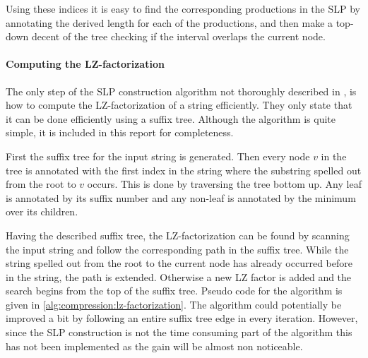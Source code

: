 \documentclass[twoside,11pt,openright]{report}
\begin{document}
Using these indices it is easy to find the corresponding productions in the SLP by annotating the derived length for each of the productions, and then make a top-down decent of the tree checking if the interval overlaps the current node.

\paragraph{Computing the LZ-factorization}
The only step of the SLP construction algorithm not thoroughly described in \cite{Rytter2003211}, is how to compute the LZ-factorization of a string efficiently. They only state that it can be done efficiently using a suffix tree. Although the algorithm is quite simple, it is included in this report for completeness.

First the suffix tree for the input string is generated. Then every node $v$ in the tree is annotated with the first index in the string where the substring spelled out from the root to $v$ occurs. This is done by traversing the tree bottom up. Any leaf is annotated by its suffix number and any non-leaf is annotated by the minimum over its children.

Having the described suffix tree, the LZ-factorization can be found by scanning the input string and follow the corresponding path in the suffix tree. While the string spelled out from the root to the current node has already occurred before in the string, the path is extended. Otherwise a new LZ factor is added and the search begins from the top of the suffix tree. Pseudo code for the algorithm is given in \cref{alg:compression:lz-factorization}. The algorithm could potentially be improved a bit by following an entire suffix tree edge in every iteration. However, since the SLP construction is not the time consuming part of the algorithm this has not been implemented as the gain will be almost non noticeable.
\end{document}
